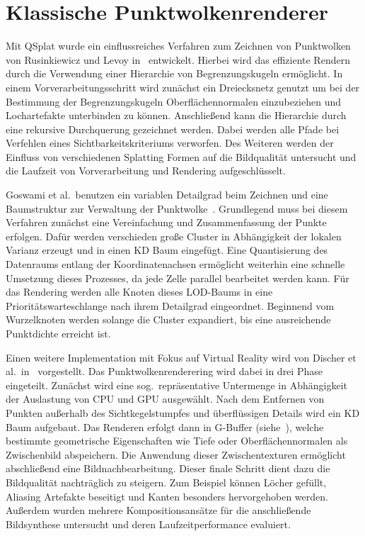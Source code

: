 \documentclass[hyperref, beleg, german]{cgvpub}
\begin{document}
\section{Klassische Punktwolkenrenderer}

Mit QSplat wurde ein einflussreiches Verfahren zum Zeichnen von Punktwolken von
Rusinkiewicz und Levoy in~\cite{rusinkiewicz2000qsplat} entwickelt. Hierbei
wird das effiziente Rendern durch die Verwendung einer Hierarchie von
Begrenzungskugeln ermöglicht. In einem Vorverarbeitungsschritt wird zunächst
ein Dreiecksnetz genutzt um bei der Bestimmung der Begrenzungskugeln
Oberflächennormalen einzubeziehen und Lochartefakte unterbinden zu können.
Anschließend kann die Hierarchie durch eine rekursive Durchquerung gezeichnet
werden. Dabei werden alle Pfade bei Verfehlen eines Sichtbarkeitskriteriums
verworfen. Des Weiteren werden der Einfluss von verschiedenen Splatting Formen
auf die Bildqualität untersucht und die Laufzeit von Vorverarbeitung und
Rendering aufgeschlüsselt.

Goswami et al.\ benutzen ein variablen Detailgrad beim Zeichnen und eine
Baumstruktur zur Verwaltung der Punktwolke~\cite{goswami2010high}. Grundlegend
muss bei diesem Verfahren zunächst eine Vereinfachung und Zusammenfassung der
Punkte erfolgen. Dafür werden verschieden große Cluster in Abhängigkeit der
lokalen Varianz erzeugt und in einen KD Baum eingefügt. Eine Quantisierung des
Datenraums entlang der Koordinatenachsen ermöglicht weiterhin eine schnelle
Umsetzung dieses Prozesses, da jede Zelle parallel bearbeitet werden kann. Für
das Rendering werden alle Knoten dieses LOD-Baums in eine
Prioritätswarteschlange nach ihrem Detailgrad eingeordnet. Beginnend vom
Wurzelknoten werden solange die Cluster expandiert, bis eine ausreichende
Punktdichte erreicht ist.

Einen weitere Implementation mit Fokus auf Virtual Reality wird von Discher et
al.\ in~\cite{discher2018point} vorgestellt. Das Punktwolkenrenderering wird
dabei in drei Phase eingeteilt. Zunächst wird eine sog.\ repräsentative
Untermenge in Abhängigkeit der Auslastung von CPU und GPU ausgewählt. Nach dem
Entfernen von Punkten außerhalb des Sichtkegelstumpfes und überflüssigen
Details wird ein KD Baum aufgebaut. Das Renderen erfolgt dann in G-Buffer
(siehe~\cite{saito1990comprehensible}), welche bestimmte geometrische
Eigenschaften wie Tiefe oder Oberflächennormalen als Zwischenbild abspeichern.
Die Anwendung dieser Zwischentexturen ermöglicht abschließend eine
Bildnachbearbeitung. Dieser finale Schritt dient dazu die Bildqualität
nachträglich zu steigern. Zum Beispiel können Löcher gefüllt, Aliasing
Artefakte beseitigt und Kanten besonders hervorgehoben werden. Außerdem wurden
mehrere Kompositionsansätze für die anschließende Bildsynthese untersucht und
deren Laufzeitperformance evaluiert.
\end{document}
